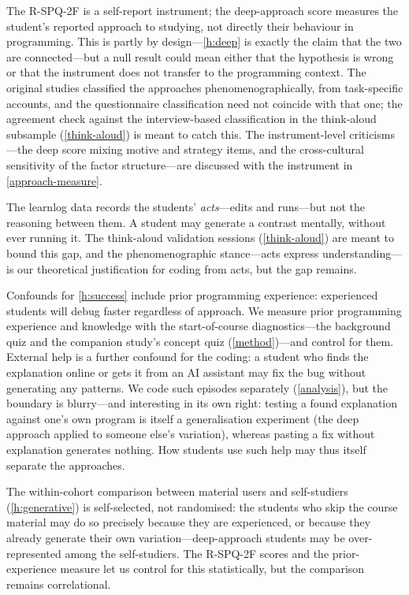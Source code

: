The R-SPQ-2F is a self-report instrument; the deep-approach score measures
the student's reported approach to studying, not directly their behaviour in
programming.
This is partly by design---\cref{h:deep} is exactly the claim that the two
are connected---but a null result could mean either that the hypothesis is
wrong or that the instrument does not transfer to the programming context.
The original studies classified the approaches phenomenographically, from
task-specific accounts, and the questionnaire classification need not
coincide with that one; the agreement check against the interview-based
classification in the think-aloud subsample (\cref{think-aloud}) is
meant to catch this.
The instrument-level criticisms---the deep score mixing motive and
strategy items, and the cross-cultural sensitivity of the factor
structure---are discussed with the instrument in \cref{approach-measure}.

The learnlog data records the students' \emph{acts}---edits and runs---but
not the reasoning between them.
A student may generate a contrast mentally, without ever running it.
The think-aloud validation sessions (\cref{think-aloud}) are meant to bound this
gap, and the phenomenographic stance---acts express understanding---is
our theoretical justification for coding from acts, but the gap remains.

Confounds for \cref{h:success} include prior programming experience:
experienced students
will debug faster regardless of approach.
We measure prior programming experience and knowledge with the
start-of-course diagnostics---the background quiz and the companion
study's concept quiz (\cref{method})---and control for them.
External help is a further confound for the coding: a student who finds the
explanation online or gets it from an AI assistant may fix the bug without
generating any patterns.
We code such episodes separately (\cref{analysis}), but the boundary is
blurry---and interesting in its own right: testing a found explanation
against one's own program is itself a generalisation experiment (the deep
approach applied to someone else's variation), whereas pasting a fix
without explanation generates nothing.
How students use such help may thus itself separate the approaches.

The within-cohort comparison between material users and self-studiers
(\cref{h:generative}) is self-selected, not randomised: the students who skip the course material may
do so precisely because they are experienced, or because they already
generate their own variation---deep-approach students may be
over-represented among the self-studiers.
The R-SPQ-2F scores and the prior-experience measure let us control for this
statistically, but the comparison remains correlational.

